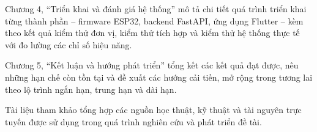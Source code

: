 \documentclass[../DoAn.tex]{subfiles}
\begin{document}
Chương 4, ``Triển khai và đánh giá hệ thống'' mô tả chi tiết quá trình triển khai từng thành phần -- firmware ESP32, backend FastAPI, ứng dụng Flutter -- kèm theo kết quả kiểm thử đơn vị, kiểm thử tích hợp và kiểm thử hệ thống thực tế với đo lường các chỉ số hiệu năng.

Chương 5, ``Kết luận và hướng phát triển'' tổng kết các kết quả đạt được, nêu những hạn chế còn tồn tại và đề xuất các hướng cải tiến, mở rộng trong tương lai theo lộ trình ngắn hạn, trung hạn và dài hạn.

Tài liệu tham khảo tổng hợp các nguồn học thuật, kỹ thuật và tài nguyên trực tuyến được sử dụng trong quá trình nghiên cứu và phát triển đề tài.
\end{document}
